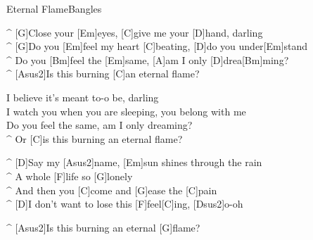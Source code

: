 \begin{song}{Eternal Flame}{Bangles}

\begin{guitar}
^ [G]Close your [Em]eyes, [C]give me your [D]hand, darling \\
^ [G]Do you [Em]feel my heart [C]beating, [D]do you under[Em]stand \\
^ Do you [Bm]feel the [Em]same, [A]am I only [D]drea[Bm]ming?\\
^ [Asus2]Is this burning [C]an eternal flame?\\
\end{guitar}

\begin{guitar}
I believe it's meant to-o be, darling\\
I watch you when you are sleeping, you belong with me\\
Do you feel the same, am I only dreaming?\\
^ Or [C]is this burning an eternal flame?\\
\end{guitar}

\begin{guitar}
^ [D]Say my [Asus2]name,  [Em]sun shines through the rain \\
^ A whole [F]life so [G]lonely \\
^ And then you [C]come and [G]ease the [C]pain \\
^ [D]I don't want to lose this [F]feel[C]ing, [Dsus2]o-oh\\
\end{guitar}



\begin{guitar}
^ [Asus2]Is this burning an eternal [G]flame?\\
\end{guitar}
\end{song}
